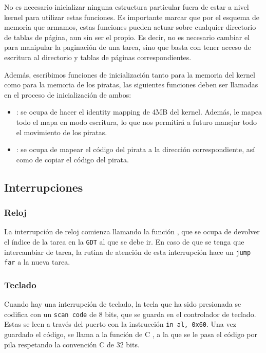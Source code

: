 No es necesario inicializar ninguna estructura particular fuera de estar a nivel kernel para utilizar estas funciones. Es importante marcar que por el esquema de memoria que armamos, estas funciones pueden actuar sobre cualquier directorio de tablas de página, aun sin ser el propio. Es decir, no es necesario cambiar el  para manipular la paginación de una tarea, sino que basta con tener acceso de escritura al directorio y tablas de páginas correspondientes.

Además, escribimos funciones de inicialización tanto para la memoria del kernel como para la memoria de los piratas, las siguientes funciones deben ser llamadas en el proceso de inicialización de ambos:

\begin{itemize}
\item {}: se ocupa de hacer el identity mapping de 4MB del kernel. Además, le mapea todo el mapa en modo escritura, lo que nos permitirá a futuro manejar todo el movimiento de los piratas.

\item {}: se ocupa de mapear el código del pirata a la dirección correspondiente, así como de copiar el código del pirata.
\end{itemize}

\subsection{Interrupciones}

\subsubsection{Reloj}

La interrupción de reloj comienza llamando la función , que se ocupa de devolver el índice de la tarea en la \texttt{GDT} al que se debe ir. En caso de que se tenga que intercambiar de tarea, la rutina de atención de esta interrupción hace un \texttt{jump far} a la nueva tarea.

\subsubsection{Teclado}

Cuando hay una interrupción de teclado, la tecla que ha sido presionada se codifica con un \texttt{scan code} de 8 bits, que se guarda en el controlador de teclado. Estas se leen a través del puerto  con la instrucción \texttt{in al, 0x60}. Una vez guardado el código, se llama a la función de C , a la que se le pasa el código por pila respetando la convención C de 32 bits.


